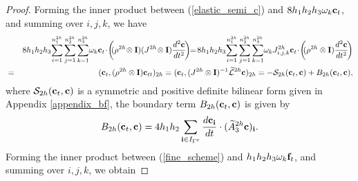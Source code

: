 \begin{proof}
		Forming the inner product between (\ref{elastic_semi_c}) and $8h_1h_2h_3\omega_k{\bf c}_t$, and summing over $i,j,k$, we have
	\footnotesize
	\begin{eqnarray}\label{coarse_simple}
	&&8h_1h_2h_3\!\sum_{i = 1}^{n_1^{2h}}\sum_{j=1}^{n_2^{2h}}\sum_{k=1}^{n_3^{2h}}\!\omega_k{\bf c}_t\!\cdot\!\left(\!\!(\rho^{2h}\!\otimes{\bf I})(J^{2h}\!\otimes{\bf I})\frac{d^2{\bf c}}{dt^2}\!\right) \!\!=\! 8h_1h_2h_3\!\sum_{i = 1}^{n_1^{2h}}\sum_{j=1}^{n_2^{2h}}\sum_{k=1}^{n_3^{2h}}\!\omega_kJ^{2h}_{i,j,k}{\bf c}_t\!\cdot\!\left(\!\!(\rho^{2h}\otimes{\bf I})\frac{d^2{\bf c}}{dt^2}\!\right)\\
	&=& ({\bf c}_t, (\rho^{2h}\otimes {\bf I}){\bf c}_{tt})_{2h} = ({\bf c}_t,(J^{2h}\otimes {\bf I})^{-1}\wt{\mathcal{L}}^{2h}{\bf c})_{2h} = -\mathcal{S}_{2h}({\bf c}_t,{\bf c}) + B_{2h}({\bf c}_t,{{\bf c}}),\nonumber
	\end{eqnarray}
	\normalsize
	where $\mathcal{S}_{2h}({\bf c}_t,{\bf c})$ is a symmetric and positive definite bilinear form given in Appendix \ref{appendix_bf}, the boundary term $B_{2h} ({\bf c}_t,{\bf c})$ is given by
	\begin{equation}\label{bounary_c1}
	B_{2h} ({\bf c}_t,{\bf c}) = 4h_1h_2\sum_{{\bf i}\in I_{\Gamma^c}}\frac{d{\bf c}_{\bf i}}{dt}\cdot (\widetilde{A}_3^{2h}{\bf c})_{\bf i}.
	\end{equation}
	Forming the inner product between (\ref{fine_scheme}) and $h_1h_2h_3\omega_k{\bf f}_t$, and summing over $i,j,k$, we obtain

\end{proof}
